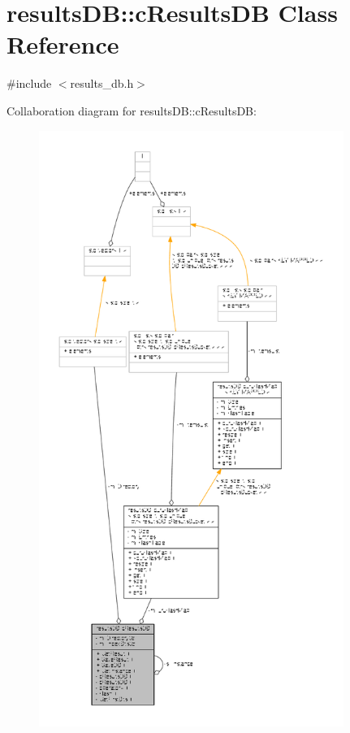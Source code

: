 \hypertarget{classresultsDB_1_1cResultsDB}{\section{results\-D\-B\-:\-:c\-Results\-D\-B Class Reference}
\label{classresultsDB_1_1cResultsDB}
}


{\ttfamily \#include $<$results\-\_\-db.\-h$>$}



Collaboration diagram for results\-D\-B\-:\-:c\-Results\-D\-B\-:
\nopagebreak
\begin{figure}[H]
\begin{center}
\leavevmode
\includegraphics[height=550pt]{classresultsDB_1_1cResultsDB__coll__graph}
\end{center}
\end{figure}
